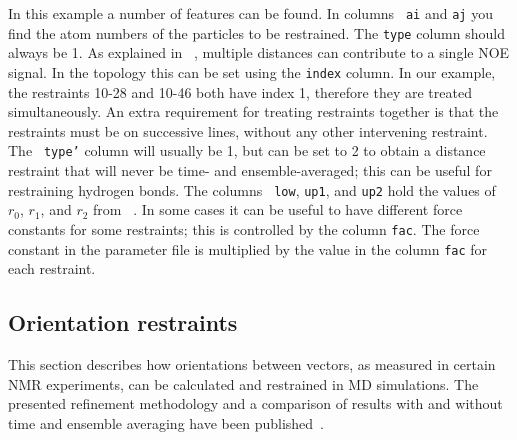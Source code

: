 In this example a number of features can be found.  In columns {\tt
ai} and {\tt aj} you find the atom numbers of the particles to be
restrained. The {\tt type} column should always be 1.  As explained in
~, multiple distances can contribute to a single NOE
signal. In the topology this can be set using the {\tt index}
column. In our example, the restraints 10-28 and 10-46 both have index
1, therefore they are treated simultaneously.  An extra requirement
for treating restraints together is that the restraints must be on
successive lines, without any other intervening restraint.  The {\tt
type'} column will usually be 1, but can be set to 2 to obtain a
distance restraint that will never be time- and ensemble-averaged;
this can be useful for restraining hydrogen bonds.  The columns {\tt
low}, {\tt up1}, and {\tt up2} hold the values of $r_0$, $r_1$, and
$r_2$ from ~.  In some cases it can be useful to have
different force constants for some restraints; this is controlled by
the column {\tt fac}.  The force constant in the parameter file is
multiplied by the value in the column {\tt fac} for each restraint.

\newcommand{\SSS}{{\mathbf S}}
\newcommand{\DD}{{\mathbf D}}
\newcommand{\RR}{{\mathbf R}}

\subsection{Orientation restraints}
\label{subsec:orientationrestraint}
This section describes how orientations between vectors,
as measured in certain NMR experiments, can be calculated
and restrained in MD simulations.
The presented refinement methodology and a comparison of results
with and without time and ensemble averaging have been
published~\cite{Hess2003}.
